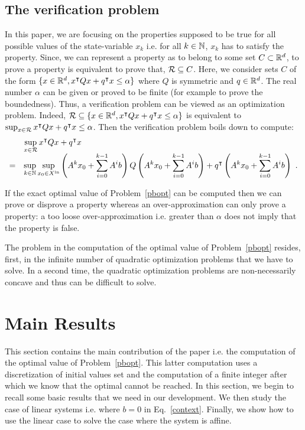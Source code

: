 \documentclass[10pt]{llncs}
\begin{document}
\subsection{The verification problem}
In this paper, we are focusing on the properties supposed to be true for all possible values of the state-variable $x_k$ i.e. for all $k\in\mathbb{N}$, $x_k$ has to satisfy the property. Since, we can represent a property as to belong to some set $C\subset \mathbb R^d$, to prove a property is equivalent to prove that, $\mathcal{R}\subseteq C$. Here, we consider sets $C$  of the form $\{x\in\mathbb R^d, x^\intercal Q x+q^\intercal x\leq \alpha\}$ where $Q$ is symmetric and $q\in\mathbb R^d$. The real number $\alpha$ can be given or proved to be finite (for example to prove the boundedness).  Thus, a verification problem can be viewed as an optimization problem. Indeed, $\mathcal{R}\subseteq \{x\in\mathbb R^d, x^\intercal Q x+q^\intercal x\leq \alpha\}$ is equivalent to
$\sup_{x\in\mathcal{R}} x^\intercal Q x+q^\intercal x\leq \alpha$.
Then the verification problem boils down to compute: 
\begin{equation}
\label{pbopt}
\begin{array}{ll}
&\displaystyle{\sup_{x\in\mathcal{R}} x^\intercal Q x+q^\intercal x}\\
=&\displaystyle{\sup_{k\in\mathbb{N}}\sup_{x_0\in X^\mathrm{in}}  \left(A^k x_0+ \sum_{i=0}^{k-1} A^i b \right) Q \left( A^k x_0+ \sum_{i=0}^{k-1} A^i b\right) +q^\intercal \left(A^k x_0+ \sum_{i=0}^{k-1} A^i b\right)}\enspace .
\end{array}
\end{equation} 

If the exact optimal value of Problem~\eqref{pbopt} can be computed then we can prove or disprove a property whereas an over-approximation can only prove a property: a too loose over-approximation i.e. greater than $\alpha$ does not imply that the property is false. 

The problem in the computation of the optimal value of Problem~\eqref{pbopt} resides, first, in the infinite number of quadratic optimization problems that we have to solve. In a second time, the quadratic optimization problems are non-necessarily concave and thus can be difficult to solve. 
\section{Main Results}
\label{mainresults}
This section contains the main contribution of the paper i.e. the computation of the optimal value of Problem~\eqref{pbopt}. This latter computation uses a discretization of initial values set and the computation of a finite integer after which we know that the optimal cannot be reached. In this section, we begin to recall some basic results that we need in our development. We then study the case of linear systems i.e. where $b=0$ in Eq.~\eqref{context}. Finally, we show how to use the linear case to solve the case where the system is affine.   
\end{document}

